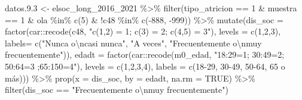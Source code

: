 \documentclass[
  12pt,
]{book}
\newenvironment{Shaded}{\begin{snugshade}}{\end{snugshade}}
\newcommand{\AttributeTok}[1]{\textcolor[rgb]{0.77,0.63,0.00}{#1}}
\newcommand{\ConstantTok}[1]{\textcolor[rgb]{0.00,0.00,0.00}{#1}}
\newcommand{\DecValTok}[1]{\textcolor[rgb]{0.00,0.00,0.81}{#1}}
\newcommand{\FloatTok}[1]{\textcolor[rgb]{0.00,0.00,0.81}{#1}}
\newcommand{\FunctionTok}[1]{\textcolor[rgb]{0.00,0.00,0.00}{#1}}
\newcommand{\NormalTok}[1]{#1}
\newcommand{\OtherTok}[1]{\textcolor[rgb]{0.56,0.35,0.01}{#1}}
\newcommand{\SpecialCharTok}[1]{\textcolor[rgb]{0.00,0.00,0.00}{#1}}
\newcommand{\StringTok}[1]{\textcolor[rgb]{0.31,0.60,0.02}{#1}}
\begin{document}
\begin{Shaded}
\begin{Highlighting}[]
\NormalTok{datos.}\FloatTok{9.3} \OtherTok{\textless{}{-}}\NormalTok{ elsoc\_long\_2016\_2021 }\SpecialCharTok{\%\textgreater{}\%} 
  \FunctionTok{filter}\NormalTok{(tipo\_atricion }\SpecialCharTok{==} \DecValTok{1} \SpecialCharTok{\&}\NormalTok{ muestra }\SpecialCharTok{==} \DecValTok{1} \SpecialCharTok{\&}\NormalTok{ ola }\SpecialCharTok{\%in\%} \FunctionTok{c}\NormalTok{(}\DecValTok{5}\NormalTok{) }\SpecialCharTok{\&} \SpecialCharTok{!}\NormalTok{c48 }\SpecialCharTok{\%in\%} \FunctionTok{c}\NormalTok{(}\SpecialCharTok{{-}}\DecValTok{888}\NormalTok{, }\SpecialCharTok{{-}}\DecValTok{999}\NormalTok{)) }\SpecialCharTok{\%\textgreater{}\%} 
  \FunctionTok{mutate}\NormalTok{(}\AttributeTok{dis\_soc =} \FunctionTok{factor}\NormalTok{(car}\SpecialCharTok{::}\FunctionTok{recode}\NormalTok{(c48, }\StringTok{"c(1,2) = 1; c(3) = 2; c(4,5) = 3"}\NormalTok{),}
                               \AttributeTok{levels =} \FunctionTok{c}\NormalTok{(}\DecValTok{1}\NormalTok{,}\DecValTok{2}\NormalTok{,}\DecValTok{3}\NormalTok{),}
                               \AttributeTok{labels=} \FunctionTok{c}\NormalTok{(}\StringTok{"Nunca o}\SpecialCharTok{\textbackslash{}n}\StringTok{casi nunca"}\NormalTok{, }\StringTok{"A veces"}\NormalTok{,}
                                         \StringTok{"Frecuentemente o}\SpecialCharTok{\textbackslash{}n}\StringTok{muy frecuentemente"}\NormalTok{)),}
         \AttributeTok{edadt =} \FunctionTok{factor}\NormalTok{(car}\SpecialCharTok{::}\FunctionTok{recode}\NormalTok{(m0\_edad, }\StringTok{"18:29=1; 30:49=2; 50:64=3 ;65:150=4"}\NormalTok{),}
                        \AttributeTok{levels =} \FunctionTok{c}\NormalTok{(}\DecValTok{1}\NormalTok{,}\DecValTok{2}\NormalTok{,}\DecValTok{3}\NormalTok{,}\DecValTok{4}\NormalTok{), }\AttributeTok{labels =} \FunctionTok{c}\NormalTok{(}\StringTok{\textquotesingle{}18{-}29\textquotesingle{}}\NormalTok{, }\StringTok{\textquotesingle{}30{-}49\textquotesingle{}}\NormalTok{, }\StringTok{\textquotesingle{}50{-}64\textquotesingle{}}\NormalTok{, }\StringTok{\textquotesingle{}65 o más\textquotesingle{}}\NormalTok{))) }\SpecialCharTok{\%\textgreater{}\%}
  \FunctionTok{prop}\NormalTok{(}\AttributeTok{x =}\NormalTok{ dis\_soc, }\AttributeTok{by =}\NormalTok{ edadt, }\AttributeTok{na.rm =} \ConstantTok{TRUE}\NormalTok{) }\SpecialCharTok{\%\textgreater{}\%} 
  \FunctionTok{filter}\NormalTok{(dis\_soc }\SpecialCharTok{==} \StringTok{"Frecuentemente o}\SpecialCharTok{\textbackslash{}n}\StringTok{muy frecuentemente"}\NormalTok{)}


\end{Highlighting}
\end{Shaded}
\end{document}
